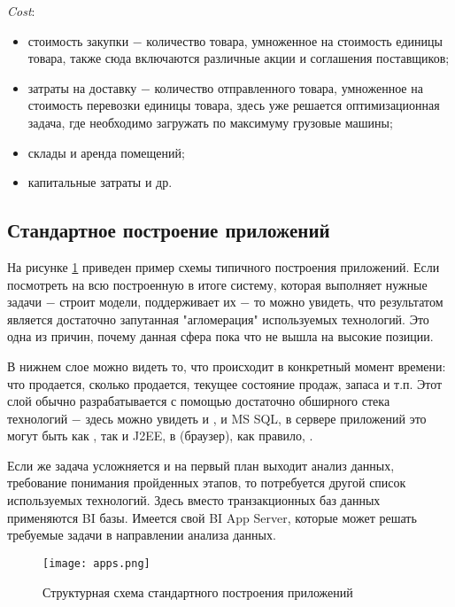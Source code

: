 \emph{Cost}:
\begin{itemize}
  \item стоимость закупки ​− количество товара, умноженное на стоимость единицы товара, также сюда включаются различные акции и соглашения поставщиков;
  \item затраты на доставку ​− количество отправленного товара, умноженное на стоимость перевозки единицы товара, здесь уже решается оптимизационная задача, где необходимо загружать по максимуму грузовые машины;
  \item склады и аренда помещений;
  \item капитальные затраты и др.
\end{itemize}

\subsection{Стандартное построение приложений}
\label{sec:domain:standard_app}

На рисунке \ref{fig:domain:standard_app:app_scheme} приведен пример схемы типичного построения приложений. Если посмотреть на всю построенную в итоге систему, которая выполняет нужные задачи ​− строит модели, поддерживает их ​− то можно увидеть, что результатом является достаточно запутанная "агломерация" используемых технологий. Это одна из причин, почему данная сфера пока что не вышла на высокие позиции.

В нижнем слое можно видеть то, что происходит в конкретный момент времени: что продается, сколько продается, текущее состояние продаж, запаса и т.п. Этот слой обычно разрабатывается с помощью достаточно обширного стека технологий ​− здесь можно увидеть и \oracle, и MS SQL, в сервере приложений это могут быть как \dotnet, так и J2EE, в \ui (браузер), как правило, \js.

Если же задача усложняется и на первый план выходит анализ данных, требование понимания пройденных этапов, то потребуется другой список используемых технологий. Здесь вместо транзакционных баз данных применяются BI базы. Имеется свой BI App Server, которые может решать требуемые задачи в направлении анализа данных.

\begin{landscape}
  \begin{figure}
  	\centering
  	\texttt{[image: apps.png]}
  	\caption{Структурная схема стандартного построения приложений}
  	\label{fig:domain:standard_app:app_scheme}
  \end{figure}
\end{landscape}

